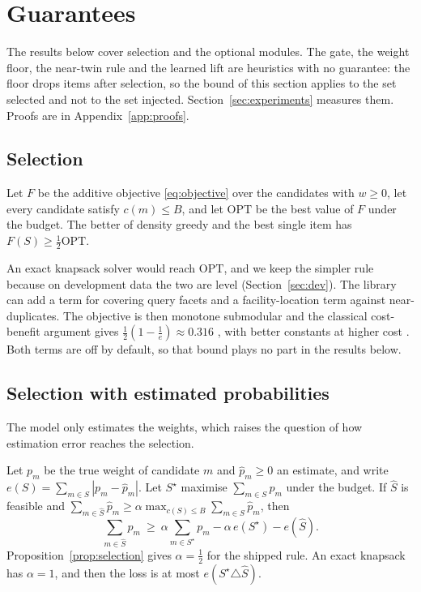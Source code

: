 \section{Guarantees}\label{sec:theory}

The results below cover selection and the optional modules. The gate, the weight floor, the near-twin rule and the learned lift are heuristics with no guarantee: the floor drops items after selection, so the bound of this section applies to the set selected and not to the set injected. Section~\ref{sec:experiments} measures them. Proofs are in Appendix~\ref{app:proofs}.

\subsection{Selection}
\begin{proposition}\label{prop:selection}
Let $F$ be the additive objective \eqref{eq:objective} over the candidates with $w\ge0$, let every candidate satisfy $c(m)\le B$, and let $\mathrm{OPT}$ be the best value of $F$ under the budget. The better of density greedy and the best single item has $F(S)\ge\frac12\mathrm{OPT}$.
\end{proposition}

An exact knapsack solver would reach $\mathrm{OPT}$, and we keep the simpler rule because on development data the two are level (Section~\ref{sec:dev}). The library can add a term for covering query facets and a facility-location term against near-duplicates. The objective is then monotone submodular and the classical cost-benefit argument gives $\frac12(1-\frac1e)\approx0.316$ \cite{krause2005note,leskovec2007cost}, with better constants at higher cost \cite{tang2021revisiting,sviridenko2004note,feldman2023practical}. Both terms are off by default, so that bound plays no part in the results below.

\subsection{Selection with estimated probabilities}
The model only estimates the weights, which raises the question of how estimation error reaches the selection.

\begin{proposition}\label{prop:calibration}
Let $p_m$ be the true weight of candidate $m$ and $\hat p_m\ge0$ an estimate, and write $e(S)=\sum_{m\in S}|p_m-\hat p_m|$. Let $S^\star$ maximise $\sum_{m\in S}p_m$ under the budget. If $\hat S$ is feasible and $\sum_{m\in\hat S}\hat p_m\ge\alpha\max_{c(S)\le B}\sum_{m\in S}\hat p_m$, then
\[\sum_{m\in\hat S}p_m\ \ge\ \alpha\sum_{m\in S^\star}p_m-\alpha\,e(S^\star)-e(\hat S).\]
Proposition~\ref{prop:selection} gives $\alpha=\frac12$ for the shipped rule. An exact knapsack has $\alpha=1$, and then the loss is at most $e(S^\star\triangle\hat S)$.
\end{proposition}

